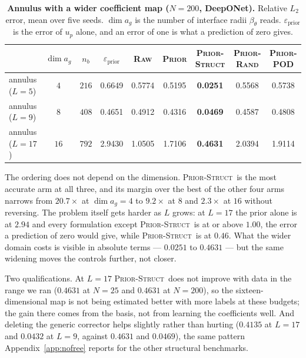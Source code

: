\documentclass{article}
\newcommand{\armraw}{\textsc{Raw}}
\newcommand{\armprior}{\textsc{Prior}}
\newcommand{\armstruct}{\textsc{Prior-Struct}}
\newcommand{\armrand}{\textsc{Prior-Rand}}
\newcommand{\armpod}{\textsc{Prior-POD}}
\begin{document}
\begin{table}[H]
\centering
\caption{\textbf{Annulus with a wider coefficient map ($N{=}200$, DeepONet).} Relative $L_2$
error, mean over five seeds. $\dim a_g$ is the number of interface radii $\beta_\theta$ reads.
$\varepsilon_{\mathrm{prior}}$ is the error of $u_p$ alone, and an error of one is what a
prediction of zero gives.}
\label{tab:beta-dim}
\footnotesize
\setlength{\tabcolsep}{7pt}
\renewcommand{\arraystretch}{0.8}
\vspace{1mm}
\begin{tabular}{@{}lcccccccc@{}}
\toprule
 & $\dim a_g$ & $n_b$ & $\varepsilon_{\mathrm{prior}}$ & \armraw & \armprior & \armstruct & \armrand & \armpod\\
\midrule
annulus ($L{=}5$)  & $4$  & $216$ & 0.6649 & 0.5774 & 0.5195 & \textbf{0.0251} & 0.5568 & 0.5738\\
annulus ($L{=}9$)  & $8$  & $408$ & 0.4651 & 0.4912 & 0.4316 & \textbf{0.0469} & 0.4587 & 0.4808\\
annulus ($L{=}17$) & $16$ & $792$ & 2.9430 & 1.0505 & 1.7106 & \textbf{0.4631} & 2.0394 & 1.9114\\
\bottomrule
\end{tabular}
\vspace{-3mm}
\end{table}

The ordering does not depend on the dimension. \armstruct\ is the most accurate arm at all three,
and its margin over the best of the other four arms narrows from $20.7\times$ at $\dim a_g{=}4$
to $9.2\times$ at $8$ and $2.3\times$ at $16$ without reversing. The problem itself gets harder as
$L$ grows: at $L{=}17$ the prior alone is at $2.94$ and every formulation except \armstruct\ is at
or above $1.00$, the error a prediction of zero would give, while \armstruct\ is at $0.46$. What
the wider domain costs is visible in absolute terms --- $0.0251$ to $0.4631$ --- but the same
widening moves the controls further, not closer.

Two qualifications. At $L{=}17$ \armstruct\ does not improve with data in the range we ran
($0.4631$ at $N{=}25$ and $0.4631$ at $N{=}200$), so the sixteen-dimensional map is not being
estimated better with more labels at these budgets; the gain there comes from the basis, not from
learning the coefficients well. And deleting the generic corrector helps slightly rather than
hurting ($0.4135$ at $L{=}17$ and $0.0432$ at $L{=}9$, against $0.4631$ and $0.0469$), the same
pattern Appendix~\ref{app:nofree} reports for the other structural benchmarks.
\end{document}
